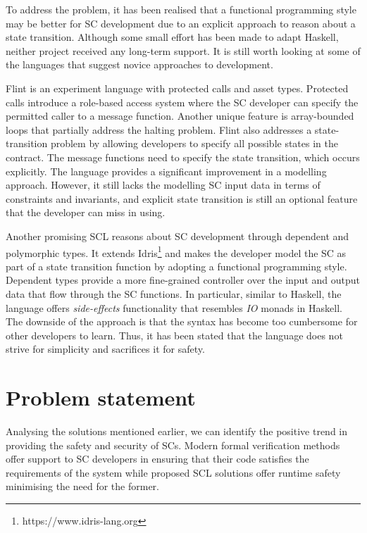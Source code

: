\documentclass[oneside]{ecsproject}     %
\begin{document}
To address the problem, it has been realised that a functional programming style may be better for SC development due to
an explicit approach to reason about a state transition. Although some small effort has been made to adapt Haskell, neither project received any long-term support. It is still worth looking at some of the languages that suggest novice approaches to development. 

Flint is an experiment language with protected calls and asset types\cite{flint}. Protected calls introduce a role-based access system
where the SC developer can specify the permitted caller to a message function. Another unique feature is array-bounded loops
that partially address the halting problem. Flint also addresses a state-transition problem by allowing developers to specify
all possible states in the contract. The message functions need to specify the state transition, which occurs explicitly.
The language provides a significant improvement in a modelling approach. However, it still lacks the modelling SC input data in terms
of constraints and invariants, and explicit state transition is still an optional feature that the developer can miss in using.

Another promising SCL reasons about SC development through dependent and polymorphic types\cite{idris}. It extends Idris\footnote{https://www.idris-lang.org} 
and makes the developer model the SC as part of a state transition function by adopting a functional programming style. Dependent types provide a more
fine-grained controller over the input and output data that flow through the SC functions. In particular, similar to Haskell, the language offers \textit{side-effects} 
functionality that resembles \textit{IO} monads in Haskell. The downside of the approach is that the syntax has become too cumbersome for other developers to learn. Thus,
it has been stated that the language does not strive for simplicity and sacrifices it for safety.


\section{Problem statement}

Analysing the solutions mentioned earlier, we can identify the positive trend in providing the safety and security of SCs.
Modern formal verification methods offer support to SC developers in ensuring that their code satisfies the requirements of the system while
proposed SCL solutions offer runtime safety minimising the need for the former.
\end{document}
